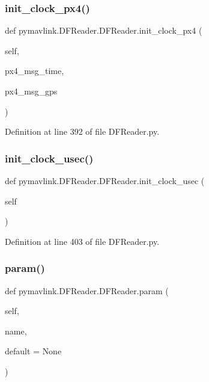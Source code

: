 \subsubsection{\texorpdfstring{init\_clock\_px4()}{init\_clock\_px4()}}
{\footnotesize\ttfamily def pymavlink.\+D\+F\+Reader.\+D\+F\+Reader.\+init\+\_\+clock\+\_\+px4 (\begin{DoxyParamCaption}\item[{}]{self,  }\item[{}]{px4\+\_\+msg\+\_\+time,  }\item[{}]{px4\+\_\+msg\+\_\+gps }\end{DoxyParamCaption})}



Definition at line 392 of file D\+F\+Reader.\+py.

\mbox{\label{classpymavlink_1_1DFReader_1_1DFReader_ab8d8991c0b0a08c78280a368c79fbd1c}} 
\subsubsection{\texorpdfstring{init\_clock\_usec()}{init\_clock\_usec()}}
{\footnotesize\ttfamily def pymavlink.\+D\+F\+Reader.\+D\+F\+Reader.\+init\+\_\+clock\+\_\+usec (\begin{DoxyParamCaption}\item[{}]{self }\end{DoxyParamCaption})}



Definition at line 403 of file D\+F\+Reader.\+py.

\mbox{\label{classpymavlink_1_1DFReader_1_1DFReader_a610321cdac70a9229612b42efc1f1dd0}} 
\subsubsection{\texorpdfstring{param()}{param()}}
{\footnotesize\ttfamily def pymavlink.\+D\+F\+Reader.\+D\+F\+Reader.\+param (\begin{DoxyParamCaption}\item[{}]{self,  }\item[{}]{name,  }\item[{}]{default = {\ttfamily None} }\end{DoxyParamCaption})}

